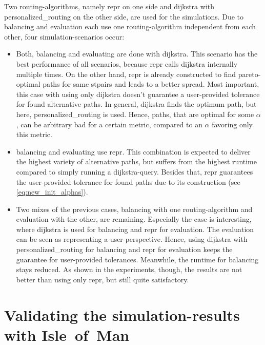     Two routing-algorithms, namely \gls{repr} on one side and \gls{dijkstra} with \gls{personalized_routing} on the other side, are used for the simulations.
    Due to \gls{balancing} and evaluation each use one routing-algorithm independent from each other, four simulation-scenarios occur:
    \begin{itemize}
        \item Both, \gls{balancing} and evaluating are done with \gls{dijkstra}.
            This scenario has the best performance of all scenarios, because \gls{repr} calls \gls{dijkstra} internally multiple times.
            On the other hand, \gls{repr} is already constructed to find pareto-optimal paths for same \glspl{stpair} and leads to a better spread.
            Most important, this case with using only \gls{dijkstra} doesn't guarantee a user-provided tolerance for found alternative paths.
            In general, \gls{dijkstra} finds the optimum path, but here, \gls{personalized_routing} is used.
            Hence, paths, that are optimal for some $\alpha$, can be arbitrary bad for a certain \gls{metric}, compared to an $\alpha$ favoring only this \gls{metric}.
        \item \Gls{balancing} and evaluating use \gls{repr}.
            This combination is expected to deliver the highest variety of alternative paths, but suffers from the highest runtime compared to simply running a \gls{dijkstra}-query.
            Besides that, \gls{repr} guarantees the user-provided tolerance for found paths due to its construction (see \vref{eq:new_init_alphas}).
        \item Two mixes of the previous cases, \gls{balancing} with one routing-algorithm and evaluation with the other, are remaining.
            Especially the case is interesting, where \gls{dijkstra} is used for \gls{balancing} and \gls{repr} for evaluation.
            The evaluation can be seen as representing a user-perspective.
            Hence, using \gls{dijkstra} with \gls{personalized_routing} for \gls{balancing} and \gls{repr} for evaluation keeps the guarantee for user-provided tolerances.
            Meanwhile, the runtime for \gls{balancing} stays reduced.
            As shown in the experiments, though, the results are not better than using only \gls{repr}, but still quite satisfactory.
    \end{itemize}

\section{Validating the simulation-results with Isle~of~Man}


